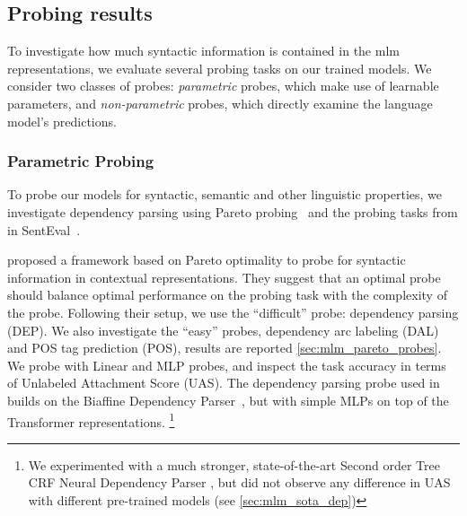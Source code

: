 \documentclass[letterpaper, 12pt]{report}
\begin{document}
\subsection{Probing results}
\label{sec:mlm_probing_results}

To investigate how much syntactic information is contained in the \acrshort{mlm} representations, we evaluate several probing tasks on our trained models. We consider two classes of probes: \textit{parametric} probes, which make use of learnable parameters, and \textit{non-parametric} probes, which directly examine the language model's predictions.

\subsubsection{Parametric Probing}
\label{sec:mlm_param_probing}

To probe our models for syntactic, semantic and other linguistic properties, we investigate dependency parsing using Pareto probing~\citep{pimentel-etal-2020-pareto} and the probing tasks from \cite{conneau-etal-2018-cram} in SentEval~\citep{conneau-kiela-2018-senteval}.

\citet{pimentel-etal-2020-pareto} proposed a framework based on Pareto optimality to probe for syntactic information in contextual representations. They suggest that an optimal probe should balance optimal performance on the probing task with the complexity of the probe. Following their setup, we use the ``difficult'' probe: dependency parsing (DEP). We also investigate the ``easy'' probes, dependency arc labeling (DAL) and POS tag prediction (POS), results are reported \autoref{sec:mlm_pareto_probes}.
We probe with Linear and MLP probes, and inspect the task accuracy in terms of Unlabeled Attachment Score (UAS).
The dependency parsing probe used in \citet{pimentel-etal-2020-pareto} builds on the Biaffine Dependency Parser~\citep{dozat2016deep}, but with simple MLPs on top of the Transformer representations.%
\footnote{We experimented with a much stronger, state-of-the-art Second order Tree CRF Neural Dependency Parser \cite{zhang-etal-2020-efficient}, but did not observe any difference in UAS with different pre-trained models (see \autoref{sec:mlm_sota_dep})}
\end{document}
